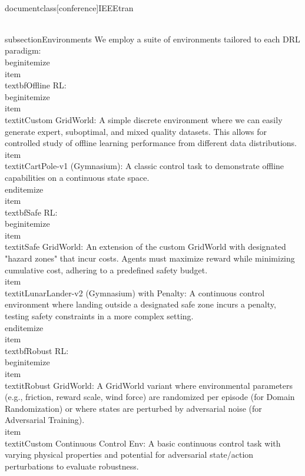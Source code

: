 \\documentclass[conference]{IEEEtran}
\begin{document}
\\subsection{Environments}
We employ a suite of environments tailored to each DRL paradigm:
\\begin{itemize}
    \\item \\textbf{Offline RL:}
    \\begin{itemize}
        \\item \\textit{Custom GridWorld:} A simple discrete environment where we can easily generate expert, suboptimal, and mixed quality datasets. This allows for controlled study of offline learning performance from different data distributions.
        \\item \\textit{CartPole-v1 (Gymnasium):} A classic control task to demonstrate offline capabilities on a continuous state space.
    \\end{itemize}
    \\item \\textbf{Safe RL:}
    \\begin{itemize}
        \\item \\textit{Safe GridWorld:} An extension of the custom GridWorld with designated "hazard zones" that incur costs. Agents must maximize reward while minimizing cumulative cost, adhering to a predefined safety budget.
        \\item \\textit{LunarLander-v2 (Gymnasium) with Penalty:} A continuous control environment where landing outside a designated safe zone incurs a penalty, testing safety constraints in a more complex setting.
    \\end{itemize}
    \\item \\textbf{Robust RL:}
    \\begin{itemize}
        \\item \\textit{Robust GridWorld:} A GridWorld variant where environmental parameters (e.g., friction, reward scale, wind force) are randomized per episode (for Domain Randomization) or where states are perturbed by adversarial noise (for Adversarial Training).
        \\item \\textit{Custom Continuous Control Env:} A basic continuous control task with varying physical properties and potential for adversarial state/action perturbations to evaluate robustness.
\end{document}
